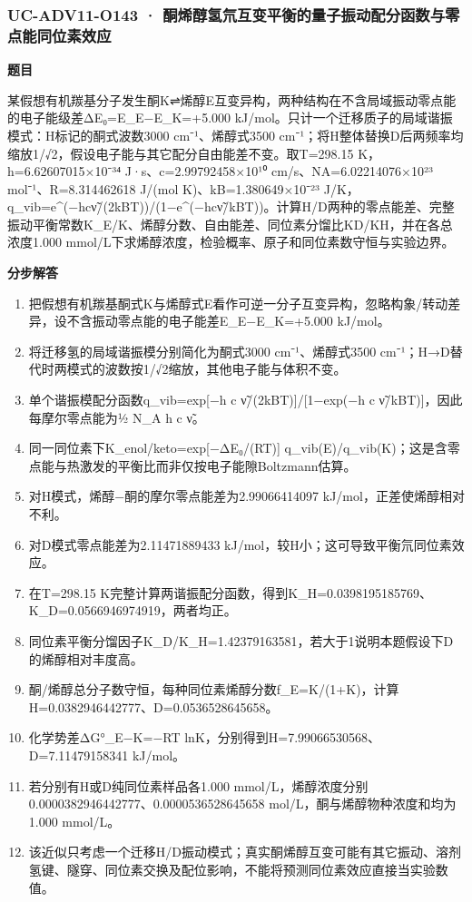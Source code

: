 \documentclass[UTF8,11pt,a4paper]{ctexart}
\begin{document}
\subsubsection*{UC-ADV11-O143 · 酮烯醇氢氘互变平衡的量子振动配分函数与零点能同位素效应}
\noindent\textbf{题目}\par
某假想有机羰基分子发生酮K⇌烯醇E互变异构，两种结构在不含局域振动零点能的电子能级差ΔE₀=E\_E−E\_K=+5.000 kJ/mol。只计一个迁移质子的局域谐振模式：H标记的酮式波数3000 cm⁻¹、烯醇式3500 cm⁻¹；将H整体替换D后两频率均缩放1/√2，假设电子能与其它配分自由能差不变。取T=298.15 K，h=6.62607015×10⁻³⁴ J·s、c=2.99792458×10¹⁰ cm/s、NA=6.02214076×10²³ mol⁻¹、R=8.314462618 J/(mol K)、kB=1.380649×10⁻²³ J/K，q\_vib=e\textasciicircum{}(−hcν̃/(2kBT))/(1−e\textasciicircum{}(−hcν̃/kBT))。计算H/D两种的零点能差、完整振动平衡常数K\_E/K、烯醇分数、自由能差、同位素分馏比KD/KH，并在各总浓度1.000 mmol/L下求烯醇浓度，检验概率、原子和同位素数守恒与实验边界。\par
\medskip\noindent\textbf{分步解答}
\begin{enumerate}
\item 把假想有机羰基酮式K与烯醇式E看作可逆一分子互变异构，忽略构象/转动差异，设不含振动零点能的电子能差E\_E−E\_K=+5.000 kJ/mol。
\item 将迁移氢的局域谐振模分别简化为酮式3000 cm⁻¹、烯醇式3500 cm⁻¹；H→D替代时两模式的波数按1/√2缩放，其他电子能与体积不变。
\item 单个谐振模配分函数q\_vib=exp[−h c ν̃/(2kBT)]/[1−exp(−h c ν̃/kBT)]，因此每摩尔零点能为½ N\_A h c ν̃。
\item 同一同位素下K\_enol/keto=exp[−ΔE₀/(RT)] q\_vib(E)/q\_vib(K)；这是含零点能与热激发的平衡比而非仅按电子能隙Boltzmann估算。
\item 对H模式，烯醇−酮的摩尔零点能差为2.99066414097 kJ/mol，正差使烯醇相对不利。
\item 对D模式零点能差为2.11471889433 kJ/mol，较H小；这可导致平衡氘同位素效应。
\item 在T=298.15 K完整计算两谐振配分函数，得到K\_H=0.0398195185769、K\_D=0.0566946974919，两者均正。
\item 同位素平衡分馏因子K\_D/K\_H=1.42379163581，若大于1说明本题假设下D的烯醇相对丰度高。
\item 酮/烯醇总分子数守恒，每种同位素烯醇分数f\_E=K/(1+K)，计算H=0.0382946442777、D=0.0536528645658。
\item 化学势差ΔG°\_E−K=−RT lnK，分别得到H=7.99066530568、D=7.11479158341 kJ/mol。
\item 若分别有H或D纯同位素样品各1.000 mmol/L，烯醇浓度分别0.0000382946442777、0.0000536528645658 mol/L，酮与烯醇物种浓度和均为1.000 mmol/L。
\item 该近似只考虑一个迁移H/D振动模式；真实酮烯醇互变可能有其它振动、溶剂氢键、隧穿、同位素交换及配位影响，不能将预测同位素效应直接当实验数值。
\end{enumerate}
\end{document}
